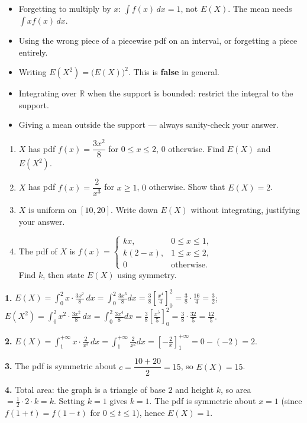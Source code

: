 \documentclass[11pt]{article}
\begin{document}
\begin{attention}
\begin{itemize}
\item Forgetting to multiply by $x$: $\displaystyle\int f(x)\,dx = 1$, not $E(X)$. The mean needs $\displaystyle\int x f(x)\,dx$.
\item Using the wrong piece of a piecewise pdf on an interval, or forgetting a piece entirely.
\item Writing $E(X^2) = \bigl(E(X)\bigr)^2$. This is \textbf{false} in general.
\item Integrating over $\mathbb{R}$ when the support is bounded: restrict the integral to the support.
\item Giving a mean outside the support --- always sanity-check your answer.
\end{itemize}
\end{attention}

\begin{exercice}[Practice]
\begin{enumerate}
\item $X$ has pdf $f(x)=\dfrac{3x^2}{8}$ for $0\le x\le 2$, $0$ otherwise. Find $E(X)$ and $E(X^2)$.
\item $X$ has pdf $f(x)=\dfrac{2}{x^3}$ for $x\ge 1$, $0$ otherwise. Show that $E(X)=2$.
\item $X$ is uniform on $[10,20]$. Write down $E(X)$ without integrating, justifying your answer.
\item The pdf of $X$ is $f(x)=\begin{cases} kx, & 0\le x\le 1,\\ k(2-x), & 1\le x\le 2,\\ 0 & \text{otherwise.}\end{cases}$\\ Find $k$, then state $E(X)$ using symmetry.
\end{enumerate}
\end{exercice}

\begin{corrige}[Exercise 1]
\textbf{1.} $E(X)=\displaystyle\int_0^2 x\cdot\frac{3x^2}{8}\,dx=\int_0^2 \frac{3x^3}{8}dx=\frac{3}{8}\left[\frac{x^4}{4}\right]_0^2=\frac{3}{8}\cdot\frac{16}{4}=\frac{3}{2}$;\\[2pt]
$E(X^2)=\displaystyle\int_0^2 x^2\cdot\frac{3x^2}{8}\,dx=\int_0^2\frac{3x^4}{8}dx=\frac{3}{8}\left[\frac{x^5}{5}\right]_0^2=\frac{3}{8}\cdot\frac{32}{5}=\frac{12}{5}$.

\textbf{2.} $E(X)=\displaystyle\int_1^{+\infty} x\cdot\frac{2}{x^3}\,dx=\int_1^{+\infty}\frac{2}{x^2}dx=\left[-\frac{2}{x}\right]_1^{+\infty}=0-(-2)=2$.

\textbf{3.} The pdf is symmetric about $c=\dfrac{10+20}{2}=15$, so $E(X)=15$.

\textbf{4.} Total area: the graph is a triangle of base $2$ and height $k$, so area $=\tfrac12\cdot 2\cdot k = k$. Setting $k=1$ gives $k=1$. The pdf is symmetric about $x=1$ (since $f(1+t)=f(1-t)$ for $0\le t\le 1$), hence $E(X)=1$.
\end{corrige}
\end{document}
